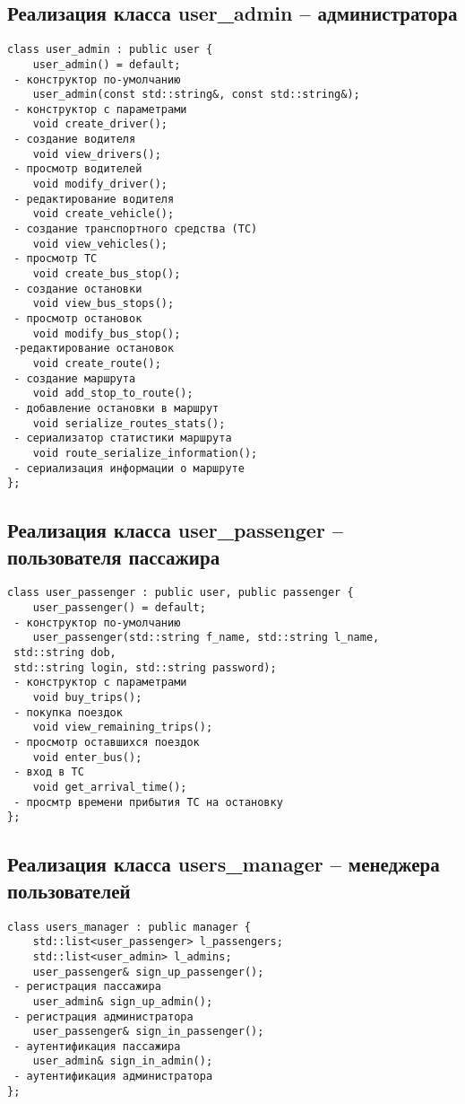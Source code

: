 \subsection{Реализация класса user\_admin -- администратора}
\begin{verbatim}
class user_admin : public user {
	user_admin() = default;
 - конструктор по-умолчанию
	user_admin(const std::string&, const std::string&);
 - конструктор с параметрами
	void create_driver();
 - создание водителя
	void view_drivers();
 - просмотр водителей
	void modify_driver();
 - редактирование водителя
	void create_vehicle();
 - создание транспортного средства (ТС)
	void view_vehicles();
 - просмотр ТС
	void create_bus_stop();
 - создание остановки
	void view_bus_stops();
 - просмотр остановок
	void modify_bus_stop();
 -редактирование остановок
	void create_route();
 - создание маршрута
	void add_stop_to_route();
 - добавление остановки в маршрут
	void serialize_routes_stats();
 - сериализатор статистики маршрута
	void route_serialize_information();
 - сериализация информации о маршруте
};

\end{verbatim}

\subsection{Реализация класса user\_passenger -- пользователя пассажира}
\begin{verbatim}
class user_passenger : public user, public passenger {
	user_passenger() = default;
 - конструктор по-умолчанию
	user_passenger(std::string f_name, std::string l_name, 
 std::string dob, 
 std::string login, std::string password);
 - конструктор с параметрами
	void buy_trips();
 - покупка поездок
	void view_remaining_trips();
 - просмотр оставшихся поездок
	void enter_bus();
 - вход в ТС
	void get_arrival_time();
 - просмтр времени прибытия ТС на остановку
};
\end{verbatim}

\subsection{Реализация класса users\_manager -- менеджера пользователей}
\begin{verbatim}
class users_manager : public manager {
	std::list<user_passenger> l_passengers;
	std::list<user_admin> l_admins;
	user_passenger& sign_up_passenger();
 - регистрация пассажира
	user_admin& sign_up_admin();
 - регистрация администратора
	user_passenger& sign_in_passenger();
 - аутентификация пассажира
	user_admin& sign_in_admin();
 - аутентификация администратора
};
\end{verbatim}

